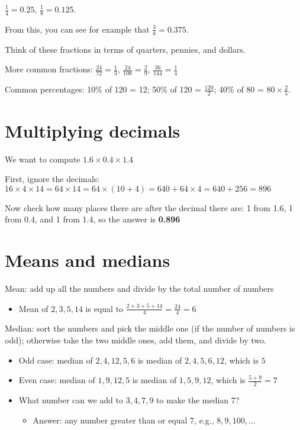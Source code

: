 \documentclass[fullpage,twocolumn]{article}
\begin{document}
$\frac{1}{4} = 0.25$, $\frac{1}{8} = 0.125$. 

From this, you can see for example that $\frac{3}{8} = 0.375$. 

Think of these fractions in terms of quarters, pennies, and dollars.

More common fractions: 
$\frac{24}{72} = \frac{1}{3}$, $\frac{24}{108} = \frac{2}{9}$, $\frac{36}{144} = \frac{1}{4}$

Common percentages: 10\% of 120 = 12; 50\% of 120 = $\frac{120}{2}$; 
40\% of 80 = $80 \times \frac{2}{5}$.

\section{Multiplying decimals}

We want to compute $1.6 \times 0.4 \times 1.4$

First, ignore the decimals:
$16 \times 4 \times 14 = 64 \times 14 = 64 \times (10 + 4) = 640 + 64 \times 4 = 640 + 256 = 896$

Now check how many places there are after the decimal there are: 1 from 1.6, 1 from 0.4, and 1 from 1.4,
so the answer is {\bf 0.896}

\section{Means and medians}

Mean: add up all the numbers and divide by the total number of numbers
\begin{itemize}
\item Mean of $2,3,5,14$ is equal to $\frac{2+3+5+14}{4} = \frac{24}{4} = 6$
\end{itemize} 

Median: sort the numbers and pick the middle one (if the number of numbers is odd); 
otherwise take the two middle ones, add them, and divide by two.
\begin{itemize}
\item Odd case: median of $2,4,12,5,6$ is median of $2,4,5,6,12$, which is $5$
\item Even case: median of $1,9,12,5$ is median of $1,5,9,12$, which is $\frac{5+9}{2}=7$
\item What number can we add to $3,4,7,9$ to make the median $7$? 
\begin{itemize}
\item Answer: any number greater than or equal 7, e.g., $8, 9, 100,\ldots$
\end{itemize} 
\end{itemize} 
\end{document}
